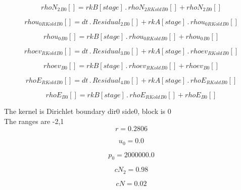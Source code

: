 \documentclass{article}
\begin{document}
\begin{dmath}{rhoN_{2}{_{B0}}}[{}] = {rkB}[{stage}] \,.\, {rhoN_{2 RKold}{_{B0}}}[{}] + {rhoN_{2}{_{B0}}}[{}]\end{dmath}

\begin{dmath}{rhou_{0 RKold}{_{B0}}}[{}] = dt \,.\, {Residual_{2}{_{B0}}}[{}] + {rkA}[{stage}] \,.\, {rhou_{0 RKold}{_{B0}}}[{}]\end{dmath}

\begin{dmath}{rhou_{0}{_{B0}}}[{}] = {rkB}[{stage}] \,.\, {rhou_{0 RKold}{_{B0}}}[{}] + {rhou_{0}{_{B0}}}[{}]\end{dmath}

\begin{dmath}{rhoev_{RKold}{_{B0}}}[{}] = dt \,.\, {Residual_{3}{_{B0}}}[{}] + {rkA}[{stage}] \,.\, {rhoev_{RKold}{_{B0}}}[{}]\end{dmath}

\begin{dmath}{rhoev{_{B0}}}[{}] = {rkB}[{stage}] \,.\, {rhoev_{RKold}{_{B0}}}[{}] + {rhoev{_{B0}}}[{}]\end{dmath}

\begin{dmath}{rhoE_{RKold}{_{B0}}}[{}] = dt \,.\, {Residual_{4}{_{B0}}}[{}] + {rkA}[{stage}] \,.\, {rhoE_{RKold}{_{B0}}}[{}]\end{dmath}

\begin{dmath}{rhoE{_{B0}}}[{}] = {rkB}[{stage}] \,.\, {rhoE_{RKold}{_{B0}}}[{}] + {rhoE{_{B0}}}[{}]\end{dmath}

\noindent The kernel is Dirichlet boundary dir0 side0, block is 0\\\noindent The ranges are -2,1\\\begin{dmath}r = 0.2806\end{dmath}

\begin{dmath}u_{0} = 0.0\end{dmath}

\begin{dmath}p_{0} = 2000000.0\end{dmath}

\begin{dmath}cN_{2} = 0.98\end{dmath}

\begin{dmath}cN = 0.02\end{dmath}
\end{document}
